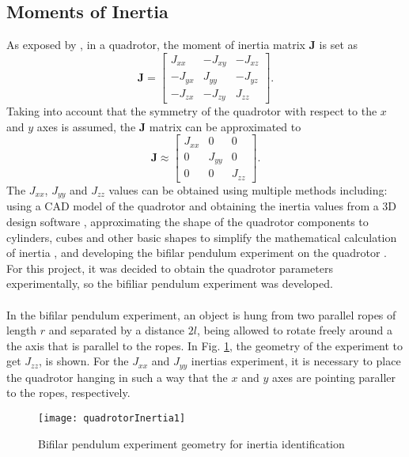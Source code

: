 \subsection{Moments of Inertia}
As exposed by \cite{Lee2011}, in a quadrotor, the moment of inertia matrix $\mathbf{J}$ is set as
\begin{equation}
\mathbf{J} = \begin{bmatrix}
J_{xx} & -J_{xy} & -J_{xz} \\
-J_{yx} & J_{yy} & -J_{yz} \\
-J_{zx} & -J_{zy} & J_{zz}
\end{bmatrix}.
\end{equation}
Taking into account that the symmetry of the quadrotor with respect to the $x$ and $y$ axes is assumed, the $\mathbf{J}$ matrix can be approximated to
\begin{equation}
\mathbf{J}  	\approx  \begin{bmatrix}
J_{xx} & 0 & 0 \\
0 & J_{yy} & 0 \\
0 & 0 & J_{zz}
\end{bmatrix}.
\end{equation}
The $J_{xx}$, $J_{yy}$ and $J_{zz}$ values can be obtained using multiple methods including: using a CAD model of the quadrotor and obtaining the inertia values from a 3D design software \cite{Khodja2017}, approximating the shape of the quadrotor components to cylinders, cubes and other basic shapes to simplify the mathematical calculation of inertia \cite{Tomas2011}, and developing the bifilar pendulum experiment on the quadrotor \cite{Garcia2017}. For this project, it was decided to obtain the quadrotor parameters experimentally, so the bifiliar pendulum experiment was developed.
\\\\
In the bifilar pendulum experiment, an object is hung from two parallel ropes of length $r$ and separated by a distance $2l$, being allowed to rotate freely around a the axis that is parallel to the ropes. In Fig. \ref{fig:bifilar}, the geometry of the experiment to get  $J_{zz}$, is shown. For the $J_{xx}$ and $J_{yy}$ inertias experiment, it is necessary to place the quadrotor hanging in such a way that the $x$ and $y$ axes are pointing paraller to the ropes, respectively.
\begin{figure}[h]
	\begin{center}
		\texttt{[image: quadrotorInertia1]}    
		\caption{Bifilar pendulum experiment geometry for inertia identification} 
		\label{fig:bifilar}
	\end{center}
\end{figure}
